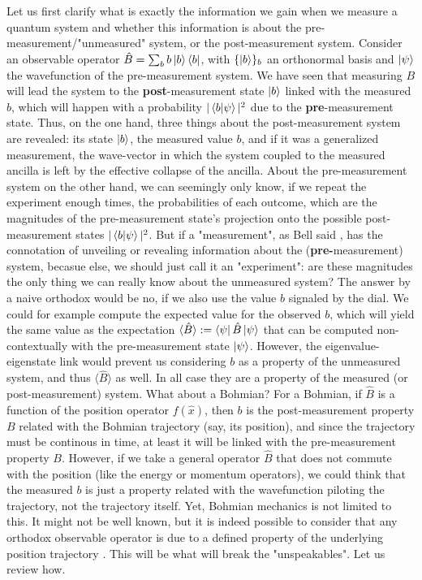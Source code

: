 \documentclass[11pt, a4paper]{article} %
\begin{document}
Let us first clarify what is exactly the information we gain when we measure a quantum system and whether this information is about the pre-measurement/"unmeasured" system, or the post-measurement system. Consider an observable operator $\hat{B}=\sum_b b\ket{b}\bra{b}$, with $\{\ket{b}\}_b$ an orthonormal basis and $\ket{\psi}$ the wavefunction of the pre-measurement system. We have seen that measuring $B$ will lead the system to the {\bf post}-measurement state $\ket{b}$ linked with the measured $b$, which will happen with a probability $|\bra{b}\ket{\psi}|^2$ due to the {\bf pre}-measurement state. Thus, on the one hand, three things about the post-measurement system are revealed: its state $\ket{b}$, the measured value $b$, and if it was a generalized measurement, the wave-vector in which the system coupled to the measured ancilla is left by the effective collapse of the ancilla. About the pre-measurement system on the other hand, we can seemingly only know, if we repeat the experiment enough times, the probabilities of each outcome, which are the magnitudes of the pre-measurement state's projection onto the possible post-measurement states $|\bra{b}\ket{\psi}|^2$. But if a "measurement", as Bell said \cite{Bell}, has the connotation of unveiling or revealing information about the ({\bf pre-}measurement) system, becasue else, we should just call it an "experiment": are these magnitudes the only thing we can really know about the unmeasured system? The answer by a naive orthodox would be no, if we also use the value $b$ signaled by the dial. We could for example compute the expected value for the observed $b$, which will yield the same value as the expectation $\langle \hat{B} \rangle:=\bra{\psi} \hat{B} \ket{\psi}$ that can be computed non-contextually with the pre-measurement state $\ket{\psi}$. However, the eigenvalue-eigenstate link would prevent us considering $b$ as a property of the unmeasured system, and thus $\langle \hat{B} \rangle$ as well. In all case they are a property of the measured (or post-measurement) system. What about a Bohmian? For a Bohmian, if $\hat{B}$ is a function of the position operator $f(\hat{x})$, then $b$ is the post-measurement property $B$ related with the Bohmian trajectory (say, its position), and since the trajectory must be continous in time, at least it will be linked with the pre-measurement property $B$. However, if we take a general operator $\hat{B}$ that does not commute with the position (like the energy or momentum operators), we could think that the measured $b$ is just a property related with the wavefunction piloting the trajectory, not the trajectory itself. Yet, Bohmian mechanics is not limited to this. It might not be well known, but it is indeed possible to consider that any orthodox observable operator is due to a defined property of the underlying position trajectory \cite{DevInPosition1, DevInPosition2}. This will be what will break the "unspeakables". Let us review how.
\end{document}
